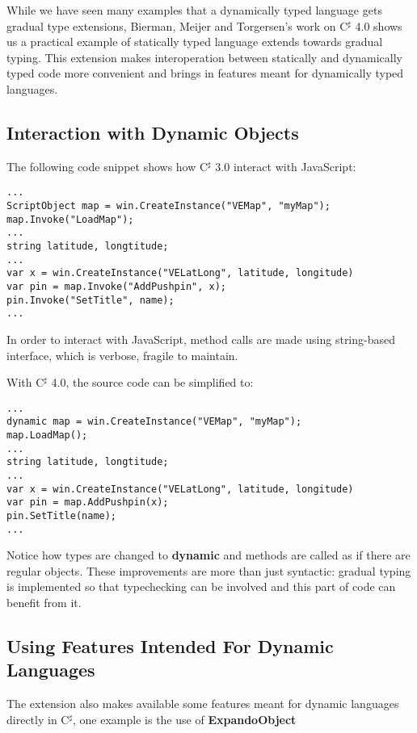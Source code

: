 While we have seen many examples that a dynamically typed language gets
gradual type extensions, Bierman, Meijer and Torgersen's work on
C$^\sharp$ 4.0 shows us a practical example of statically typed language
extends towards gradual typing.
This extension makes interoperation between statically and dynamically typed code
more convenient and brings in features meant for dynamically typed languages.

\subsection{Interaction with Dynamic Objects}

The following code snippet shows how C$^\sharp$ 3.0 interact with JavaScript:

\begin{verbatim}
...
ScriptObject map = win.CreateInstance("VEMap", "myMap");
map.Invoke("LoadMap");
...
string latitude, longtitude;
...
var x = win.CreateInstance("VELatLong", latitude, longitude)
var pin = map.Invoke("AddPushpin", x);
pin.Invoke("SetTitle", name);
...
\end{verbatim}

In order to interact with JavaScript, method calls
are made using string-based interface, which is verbose, fragile to maintain.

With C$^\sharp$ 4.0, the source code can be simplified to:

\begin{verbatim}
...
dynamic map = win.CreateInstance("VEMap", "myMap");
map.LoadMap();
...
string latitude, longtitude;
...
var x = win.CreateInstance("VELatLong", latitude, longitude)
var pin = map.AddPushpin(x);
pin.SetTitle(name);
...
\end{verbatim}

Notice how types are changed to \textbf{dynamic} and methods are called
as if there are regular objects.
These improvements are more than just syntactic: gradual typing is implemented
so that typechecking can be involved and this part of code can benefit from it.

\subsection{Using Features Intended For Dynamic Languages}

The extension also makes available some features meant for dynamic languages
directly in C$^\sharp$, one example is the use of \textbf{ExpandoObject}

